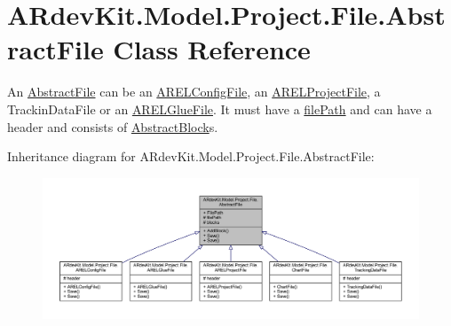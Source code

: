 \hypertarget{class_a_rdev_kit_1_1_model_1_1_project_1_1_file_1_1_abstract_file}{\section{A\-Rdev\-Kit.\-Model.\-Project.\-File.\-Abstract\-File Class Reference}
\label{class_a_rdev_kit_1_1_model_1_1_project_1_1_file_1_1_abstract_file}
}


An \hyperlink{class_a_rdev_kit_1_1_model_1_1_project_1_1_file_1_1_abstract_file}{Abstract\-File} can be an \hyperlink{class_a_rdev_kit_1_1_model_1_1_project_1_1_file_1_1_a_r_e_l_config_file}{A\-R\-E\-L\-Config\-File}, an \hyperlink{class_a_rdev_kit_1_1_model_1_1_project_1_1_file_1_1_a_r_e_l_project_file}{A\-R\-E\-L\-Project\-File}, a Trackin\-Data\-File or an \hyperlink{class_a_rdev_kit_1_1_model_1_1_project_1_1_file_1_1_a_r_e_l_glue_file}{A\-R\-E\-L\-Glue\-File}. It must have a \hyperlink{class_a_rdev_kit_1_1_model_1_1_project_1_1_file_1_1_abstract_file_ad879e3a81860da8b72f2d9f61a18ab3b}{file\-Path} and can have a header and consists of \hyperlink{class_a_rdev_kit_1_1_model_1_1_project_1_1_file_1_1_abstract_block}{Abstract\-Block}s.  




Inheritance diagram for A\-Rdev\-Kit.\-Model.\-Project.\-File.\-Abstract\-File\-:
\nopagebreak
\begin{figure}[H]
\begin{center}
\leavevmode
\includegraphics[width=350pt]{class_a_rdev_kit_1_1_model_1_1_project_1_1_file_1_1_abstract_file__inherit__graph}
\end{center}
\end{figure}



